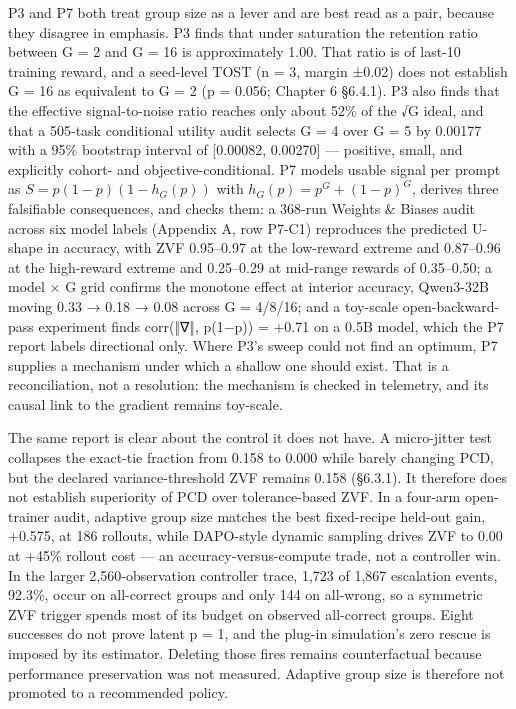 \documentclass[12pt,a4paper]{report}
\begin{document}
P3 and P7 both treat group size as a lever and are best read as a pair,
because they disagree in emphasis. P3 finds that under saturation the
retention ratio between G = 2 and G = 16 is approximately 1.00. That
ratio is of last-10 training reward, and a seed-level TOST (n = 3,
margin ±0.02) does not establish G = 16 as equivalent to G = 2 (p =
0.056; Chapter 6 §6.4.1). P3 also finds that the effective
signal-to-noise ratio reaches only about 52\% of the √G ideal, and that
a 505-task conditional utility audit selects G = 4 over G = 5 by 0.00177
with a 95\% bootstrap interval of {[}0.00082, 0.00270{]} --- positive,
small, and explicitly cohort- and objective-conditional. P7 models
usable signal per prompt as \(S = p(1-p)(1-h_G(p))\) with
\(h_G(p) = p^G + (1-p)^G\), derives three falsifiable consequences, and
checks them: a 368-run Weights \& Biases audit across six model labels
(Appendix A, row P7-C1) reproduces the predicted U-shape in accuracy,
with ZVF 0.95--0.97 at the low-reward extreme and 0.87--0.96 at the
high-reward extreme and 0.25--0.29 at mid-range rewards of 0.35--0.50; a
model × G grid confirms the monotone effect at interior accuracy,
Qwen3-32B moving 0.33 → 0.18 → 0.08 across G = 4/8/16; and a toy-scale
open-backward-pass experiment finds corr(‖∇‖, p(1−p)) = +0.71 on a 0.5B
model, which the P7 report labels directional only. Where P3's sweep
could not find an optimum, P7 supplies a mechanism under which a shallow
one should exist. That is a reconciliation, not a resolution: the
mechanism is checked in telemetry, and its causal link to the gradient
remains toy-scale.

The same report is clear about the control it does not have. A
micro-jitter test collapses the exact-tie fraction from 0.158 to 0.000
while barely changing PCD, but the declared variance-threshold ZVF
remains 0.158 (§6.3.1). It therefore does not establish superiority of
PCD over tolerance-based ZVF. In a four-arm open-trainer audit, adaptive
group size matches the best fixed-recipe held-out gain, +0.575, at 186
rollouts, while DAPO-style dynamic sampling drives ZVF to 0.00 at +45\%
rollout cost --- an accuracy-versus-compute trade, not a controller win.
In the larger 2,560-observation controller trace, 1,723 of 1,867
escalation events, 92.3\%, occur on all-correct groups and only 144 on
all-wrong, so a symmetric ZVF trigger spends most of its budget on
observed all-correct groups. Eight successes do not prove latent p = 1,
and the plug-in simulation's zero rescue is imposed by its estimator.
Deleting those fires remains counterfactual because performance
preservation was not measured. Adaptive group size is therefore not
promoted to a recommended policy.
\end{document}
